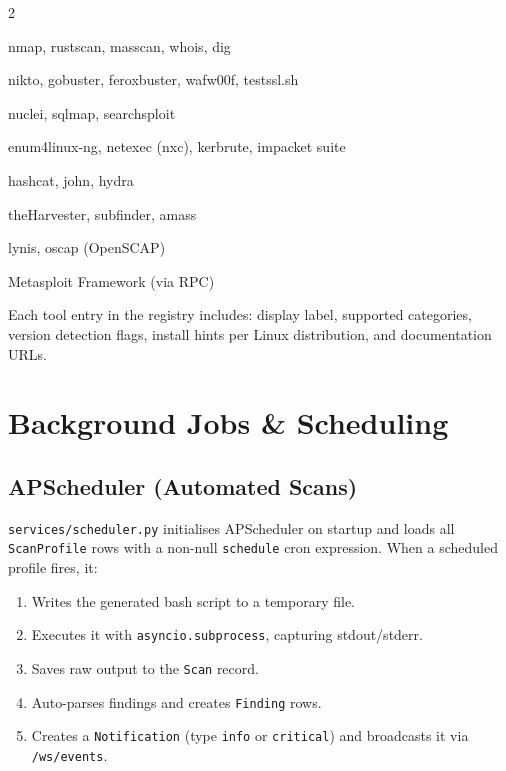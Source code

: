 \documentclass[11pt,a4paper,twoside,openright]{book}
\begin{document}
\begin{multicols}{2}
\begin{description}[leftmargin=!,labelwidth=\widthof{\textbf{Active Directory}}]
  \item[Network Recon] nmap, rustscan, masscan, whois, dig
  \item[Web Scanning] nikto, gobuster, feroxbuster, wafw00f, testssl.sh
  \item[Vulnerability] nuclei, sqlmap, searchsploit
  \item[Active Directory] enum4linux-ng, netexec (nxc), kerbrute, impacket suite
  \item[Password] hashcat, john, hydra
  \item[OSINT] theHarvester, subfinder, amass
  \item[Hardening] lynis, oscap (OpenSCAP)
  \item[C2] Metasploit Framework (via RPC)
\end{description}
\end{multicols}

Each tool entry in the registry includes: display label, supported categories, version detection flags, install hints per Linux distribution, and documentation URLs.

\section{Background Jobs \& Scheduling}

\subsection{APScheduler (Automated Scans)}

\texttt{services/scheduler.py} initialises APScheduler on startup and loads all \texttt{ScanProfile} rows with a non-null \texttt{schedule} cron expression. When a scheduled profile fires, it:

\begin{enumerate}[leftmargin=*,noitemsep]
  \item Writes the generated bash script to a temporary file.
  \item Executes it with \texttt{asyncio.subprocess}, capturing stdout/stderr.
  \item Saves raw output to the \texttt{Scan} record.
  \item Auto-parses findings and creates \texttt{Finding} rows.
  \item Creates a \texttt{Notification} (type \texttt{info} or \texttt{critical}) and broadcasts it via \texttt{/ws/events}.
\end{enumerate}
\end{document}
